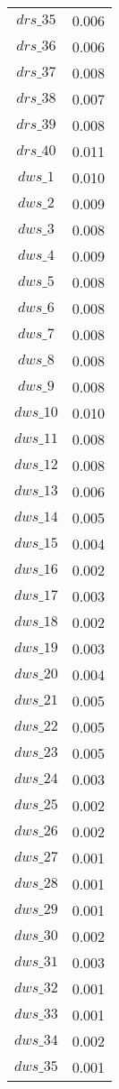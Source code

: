 \begin{center}
\begin{longtable}{cc}
$drs\_35$ 	 & 	 0.006 \\
$drs\_36$ 	 & 	 0.006 \\
$drs\_37$ 	 & 	 0.008 \\
$drs\_38$ 	 & 	 0.007 \\
$drs\_39$ 	 & 	 0.008 \\
$drs\_40$ 	 & 	 0.011 \\
$dws\_1$ 	 & 	 0.010 \\
$dws\_2$ 	 & 	 0.009 \\
$dws\_3$ 	 & 	 0.008 \\
$dws\_4$ 	 & 	 0.009 \\
$dws\_5$ 	 & 	 0.008 \\
$dws\_6$ 	 & 	 0.008 \\
$dws\_7$ 	 & 	 0.008 \\
$dws\_8$ 	 & 	 0.008 \\
$dws\_9$ 	 & 	 0.008 \\
$dws\_10$ 	 & 	 0.010 \\
$dws\_11$ 	 & 	 0.008 \\
$dws\_12$ 	 & 	 0.008 \\
$dws\_13$ 	 & 	 0.006 \\
$dws\_14$ 	 & 	 0.005 \\
$dws\_15$ 	 & 	 0.004 \\
$dws\_16$ 	 & 	 0.002 \\
$dws\_17$ 	 & 	 0.003 \\
$dws\_18$ 	 & 	 0.002 \\
$dws\_19$ 	 & 	 0.003 \\
$dws\_20$ 	 & 	 0.004 \\
$dws\_21$ 	 & 	 0.005 \\
$dws\_22$ 	 & 	 0.005 \\
$dws\_23$ 	 & 	 0.005 \\
$dws\_24$ 	 & 	 0.003 \\
$dws\_25$ 	 & 	 0.002 \\
$dws\_26$ 	 & 	 0.002 \\
$dws\_27$ 	 & 	 0.001 \\
$dws\_28$ 	 & 	 0.001 \\
$dws\_29$ 	 & 	 0.001 \\
$dws\_30$ 	 & 	 0.002 \\
$dws\_31$ 	 & 	 0.003 \\
$dws\_32$ 	 & 	 0.001 \\
$dws\_33$ 	 & 	 0.001 \\
$dws\_34$ 	 & 	 0.002 \\
$dws\_35$ 	 & 	 0.001 \\

\end{longtable}
\end{center}
